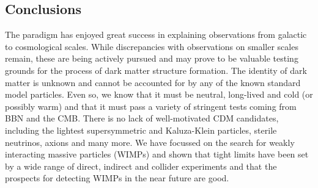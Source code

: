 \subsection{Conclusions}

The \LCDM paradigm has enjoyed great success in explaining observations from galactic to cosmological scales. While discrepancies with observations on smaller scales remain, these are being actively pursued and may prove to be valuable testing grounds for the process of dark matter structure formation. The identity of dark matter is unknown and cannot be accounted for by any of the known standard model particles. Even so, we know that it must be neutral, long-lived and cold (or possibly warm) and that it must pass a variety of stringent tests coming from BBN and the CMB. There is no lack of well-motivated CDM candidates, including the lightest supersymmetric and Kaluza-Klein particles, sterile neutrinos, axions and many more. We have focussed on the search for weakly interacting massive particles (WIMPs) and shown that tight limits have been set by a wide range of direct, indirect and collider experiments and that the prospects for detecting WIMPs in the near future are good. 
